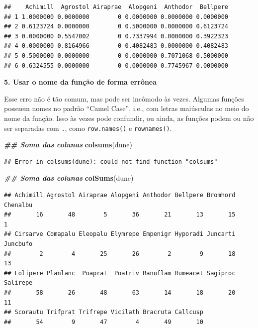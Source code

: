 \documentclass[
]{article}
\newenvironment{Shaded}{\begin{snugshade}}{\end{snugshade}}
\newcommand{\DocumentationTok}[1]{\textcolor[rgb]{0.56,0.35,0.01}{\textbf{\textit{#1}}}}
\newcommand{\FunctionTok}[1]{\textcolor[rgb]{0.13,0.29,0.53}{\textbf{#1}}}
\newcommand{\NormalTok}[1]{#1}
\begin{document}
\begin{verbatim}
##    Achimill  Agrostol Airaprae  Alopgeni  Anthodor  Bellpere
## 1 1.0000000 0.0000000        0 0.0000000 0.0000000 0.0000000
## 2 0.6123724 0.0000000        0 0.5000000 0.0000000 0.6123724
## 3 0.0000000 0.5547002        0 0.7337994 0.0000000 0.3922323
## 4 0.0000000 0.8164966        0 0.4082483 0.0000000 0.4082483
## 5 0.5000000 0.0000000        0 0.0000000 0.7071068 0.5000000
## 6 0.6324555 0.0000000        0 0.0000000 0.7745967 0.0000000
\end{verbatim}

\textbf{5. Usar o nome da função de forma errônea}

Esse erro não é tão comum, mas pode ser incômodo às vezes. Algumas funções possuem nomes no padrão ``Camel Case'', i.e., com letras maiúsculas no meio do nome da função. Isso às vezes pode confundir, ou ainda, as funções podem ou não ser separadas com \texttt{.}, como \texttt{row.names()} e \texttt{rownames()}.

\begin{Shaded}
\begin{Highlighting}[]
\DocumentationTok{\#\# Soma das colunas}
\FunctionTok{colsums}\NormalTok{(dune)}
\end{Highlighting}
\end{Shaded}

\begin{verbatim}
## Error in colsums(dune): could not find function "colsums"
\end{verbatim}

\begin{Shaded}
\begin{Highlighting}[]
\DocumentationTok{\#\# Soma das colunas}
\FunctionTok{colSums}\NormalTok{(dune)}
\end{Highlighting}
\end{Shaded}

\begin{verbatim}
## Achimill Agrostol Airaprae Alopgeni Anthodor Bellpere Bromhord Chenalbu 
##       16       48        5       36       21       13       15        1 
## Cirsarve Comapalu Eleopalu Elymrepe Empenigr Hyporadi Juncarti Juncbufo 
##        2        4       25       26        2        9       18       13 
## Lolipere Planlanc  Poaprat  Poatriv Ranuflam Rumeacet Sagiproc Salirepe 
##       58       26       48       63       14       18       20       11 
## Scorautu Trifprat Trifrepe Vicilath Bracruta Callcusp 
##       54        9       47        4       49       10
\end{verbatim}
\end{document}
